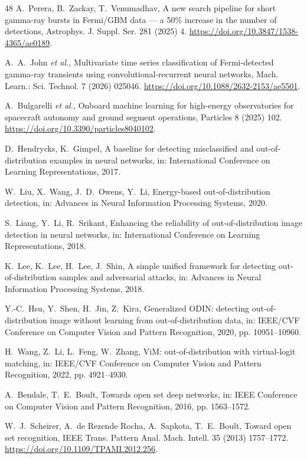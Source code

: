 \documentclass[preprint,12pt]{elsarticle}
\begin{document}
\begin{thebibliography}{48}
 A.~Perera, B.~Zackay, T.~Venumadhav, A new search pipeline for short gamma-ray bursts in Fermi/GBM data --- a 50\% increase in the number of detections, Astrophys. J. Suppl. Ser. 281 (2025) 4. \url{https://doi.org/10.3847/1538-4365/ae0189}.

 A.~A.~John \textit{et al.}, Multivariate time series classification of Fermi-detected gamma-ray transients using convolutional-recurrent neural networks, Mach. Learn.: Sci. Technol. 7 (2026) 025046. \url{https://doi.org/10.1088/2632-2153/ae5501}.

 A.~Bulgarelli \textit{et al.}, Onboard machine learning for high-energy observatories for spacecraft autonomy and ground segment operations, Particles 8 (2025) 102. \url{https://doi.org/10.3390/particles8040102}.

 D.~Hendrycks, K.~Gimpel, A baseline for detecting misclassified and out-of-distribution examples in neural networks, in: International Conference on Learning Representations, 2017.

 W.~Liu, X.~Wang, J.~D.~Owens, Y.~Li, Energy-based out-of-distribution detection, in: Advances in Neural Information Processing Systems, 2020.

 S.~Liang, Y.~Li, R.~Srikant, Enhancing the reliability of out-of-distribution image detection in neural networks, in: International Conference on Learning Representations, 2018.

 K.~Lee, K.~Lee, H.~Lee, J.~Shin, A simple unified framework for detecting out-of-distribution samples and adversarial attacks, in: Advances in Neural Information Processing Systems, 2018.

 Y.-C.~Hsu, Y.~Shen, H.~Jin, Z.~Kira, Generalized ODIN: detecting out-of-distribution image without learning from out-of-distribution data, in: IEEE/CVF Conference on Computer Vision and Pattern Recognition, 2020, pp. 10951--10960.

 H.~Wang, Z.~Li, L.~Feng, W.~Zhang, ViM: out-of-distribution with virtual-logit matching, in: IEEE/CVF Conference on Computer Vision and Pattern Recognition, 2022, pp. 4921--4930.

 A.~Bendale, T.~E.~Boult, Towards open set deep networks, in: IEEE Conference on Computer Vision and Pattern Recognition, 2016, pp. 1563--1572.

 W.~J.~Scheirer, A.~de Rezende Rocha, A.~Sapkota, T.~E.~Boult, Toward open set recognition, IEEE Trans. Pattern Anal. Mach. Intell. 35 (2013) 1757--1772. \url{https://doi.org/10.1109/TPAMI.2012.256}.


\end{thebibliography}
\end{document}
